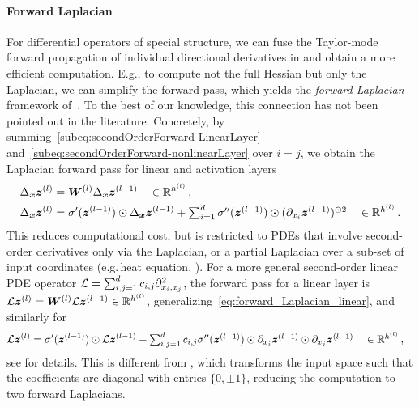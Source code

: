 \paragraph{Forward Laplacian} For differential operators of special structure, we can fuse the Taylor-mode forward propagation of individual directional derivatives in  and obtain a more efficient computation.
E.g., to compute not the full Hessian but only the Laplacian, we can simplify the forward pass, which yields the \emph{forward Laplacian} framework of~\citet{li2023forward}.
To the best of our knowledge, this connection has not been pointed out in the literature.
Concretely, by summing~\eqref{subeq:secondOrderForward-LinearLayer} and~\eqref{subeq:secondOrderForward-nonlinearLayer} over $i=j$, we obtain the Laplacian forward pass for linear and activation layers
\begin{subequations}\label{eq:forward-laplacian-main}
  \begin{align}
    \label{eq:forward_Laplacian_linear}
    \Delta_{\bm{x}}{\bm{z}}^{(l)}
    &=
      {\bm{W}}^{(l)}\Delta_{\bm{x}}{\bm{z}}^{(l-1)}
      \quad \in {\mathbb{R}}^{h^{(l)}}\,,
    \\
    \label{eq:forward_Laplacian_nonlinear}
    \Delta_{\bm{x}}{\bm{z}}^{(l)}
    &=
      \sigma'({\bm{z}}^{(l-1)})\odot\Delta_{\bm{x}}{\bm{z}}^{(l-1)}
      +
      \textstyle
      \sum_{i=1}^d \sigma''({\bm{z}}^{(l-1)})\odot (\partial_{x_i}{{\bm{z}}^{(l-1)}})^{\odot 2}
      \quad \in {\mathbb{R}}^{h^{(l)}}\,.
  \end{align}
\end{subequations}
This reduces computational cost, but is restricted to PDEs that involve second-order derivatives only via the Laplacian, or a partial Laplacian over a sub-set of input coordinates (e.g.\,heat equation, ).
For a more general second-order linear PDE operator ${\mathcal{L}} = \sum_{i,j=1}^d c_{i,j} \partial^2_{{x}_i,{x}_j}$, the forward pass for a linear layer is $\mathcal{L} {\bm{z}}^{(l)} = {\bm{W}}^{(l)}\mathcal{L} {\bm{z}}^{(l-1)} \in {\mathbb{R}}^{h^{(l)}}$, generalizing~\eqref{eq:forward_Laplacian_linear}, and similarly for~
\begin{align*}
  \mathcal{L}{\bm{z}}^{(l)}
  &=
    \sigma'({\bm{z}}^{(l-1)})\odot\mathcal{L}{\bm{z}}^{(l-1)}
    +
    \textstyle
    \sum_{i,j=1}^d c_{i,j} \sigma''({\bm{z}}^{(l-1)})\odot \partial_{x_i}{{\bm{z}}^{(l-1)}}\odot \partial_{x_j}{{\bm{z}}^{(l-1)}}
    \quad \in {\mathbb{R}}^{h^{(l)}}\,,
\end{align*}
see  for details. This is different from \cite{li2024dof}, which transforms the input space such that the coefficients are diagonal with entries $\{0, \pm 1\}$, reducing the computation to two forward Laplacians.

